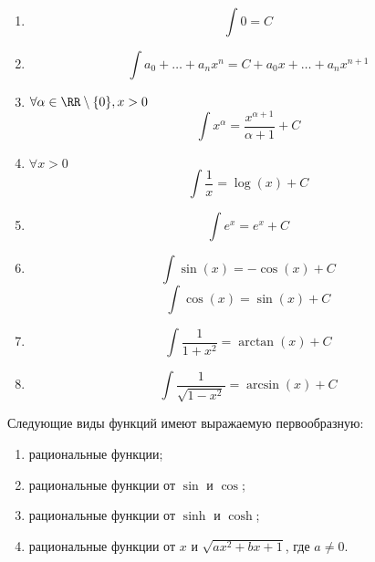 \documentclass[12pt,a4paper]{article}
\begin{document}
    \begin{lemma}\ 
        \begin{multicols}{2}
            \begin{enumerate}
                \item \[\int 0 = C\]
                \item \[\int a_0 + \dots + a_n x^n = C + a_0 x + \dots + a_n x^{n+1} \]
                \item $\forall \alpha \in \RR \setminus \{0\}, x > 0$
                    \[\int x^\alpha = \frac{x^{\alpha + 1}}{\alpha + 1} + C\]
                \item $\forall x > 0$
                    \[\int \frac{1}{x} = \log(x) + C\]
                \item \[\int e^x = e^x + C\]
                \item \[\int \sin(x) = -\cos(x) + C\] \[\int \cos(x) = \sin(x) + C\]
                \item \[\int \frac{1}{1+x^2} = \arctan(x) + C\]
                \item \[\int \frac{1}{\sqrt{1-x^2}} = \arcsin(x) + C\]
            \end{enumerate}
        \end{multicols}
    \end{lemma}

    \begin{theorem}
        Следующие виды функций имеют выражаемую первообразную:
        \begin{multicols}{2}
            \begin{enumerate}
                \item рациональные функции;
                \item рациональные функции от $\sin$ и $\cos$;
                \item рациональные функции от $\sinh$ и $\cosh$;
                \item рациональные функции от $x$ и $\sqrt{ax^2 + bx + 1}$, где $a \neq 0$.
            \end{enumerate}
        \end{multicols}
    \end{theorem}
\end{document}
